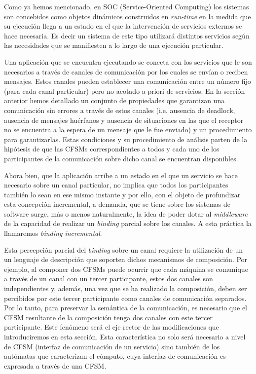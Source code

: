 
Como ya hemos mencionado, en SOC (Service-Oriented Computing) los sistemas son concebidos como objetos dinámicos construidos en \emph{run-time} en la medida que su ejecución llega a un estado en el que la intervención de servicios externos se hace necesaria. Es decir un sistema de este tipo utilizará distintos servicios según las necesidades que se manifiesten a lo largo de una ejecución particular. 
 
Una aplicación que se encuentra ejecutando se conecta con los servicios que le son necesarios a través de canales de comunicación por los cuales se envían o reciben mensajes. Estos canales pueden establecer una comunicación entre un número fijo (para cada canal particular) pero no acotado a priori de servicios. En la sección anterior hemos detallado un conjunto de propiedades que garantizan una comunicación sin errores a través de estos canales (i.e. ausencia de deadlock, ausencia de mensajes huérfanos y ausencia de situaciones en las que el receptor no se encuentra a la espera de un mensaje que le fue enviado) y un procedimiento para garantizarlas. Estas condiciones y su procedimiento de análisis parten de la hipótesis de que las CFSMs correspondientes a todos y cada uno de los participantes de la comunicación sobre dicho canal se encuentran disponibles.

Ahora bien, que la aplicación arribe a un estado en el que un servicio se hace necesario sobre un canal particular, no implica que todos los participantes también lo sean en ese mismo instante y por ello, con el objeto de profundizar esta concepción incremental, a demanda, que se tiene sobre los sistemas de software surge, más o menos naturalmente, la idea de poder dotar al \emph{middleware} de la capacidad de realizar un \emph{binding} parcial sobre los canales. A esta práctica la llamaremos \emph{binding incremental}.
 
Esta percepción parcial del \emph{binding} sobre un canal requiere la utilización de un un lenguaje de descripción que soporten dichos mecanismos de composición. Por ejemplo, al componer dos CFSMs puede ocurrir que cada máquina se comunique a través de un canal con un tercer participante, estos dos canales son independientes y, además, una vez que se ha realizado la composición, deben ser percibidos por este tercer participante como canales de comunicación separados. Por lo tanto, para preservar la semántica de la comunicación, es necesario que el CFSM resultante de la composición tenga dos canales con este tercer participante. Este fenómeno será el eje rector de las modificaciones que introduciremos en esta sección. Esta característica no solo será necesario a nivel de CFSM (interfaz de comunicación de un servicio) sino también de los autómatas que caracterizan el cómputo, cuya interfaz de comunicación es expresada a través de una CFSM.


